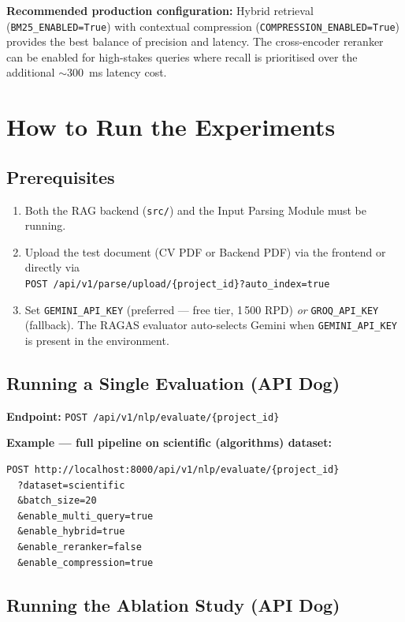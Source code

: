 \documentclass[12pt,a4paper]{article}
\begin{document}
\textbf{Recommended production configuration:} Hybrid retrieval (\texttt{BM25\_ENABLED=True}) with
contextual compression (\texttt{COMPRESSION\_ENABLED=True}) provides the best balance of precision
and latency. The cross-encoder reranker can be enabled for high-stakes queries where recall is
prioritised over the additional $\sim$300~ms latency cost.

\section{How to Run the Experiments}

\subsection{Prerequisites}
\begin{enumerate}
  \item Both the RAG backend (\texttt{src/}) and the Input Parsing Module must be running.
  \item Upload the test document (CV PDF or Backend PDF) via the frontend or directly via\\
    \texttt{POST /api/v1/parse/upload/\{project\_id\}?auto\_index=true}
  \item Set \texttt{GEMINI\_API\_KEY} (preferred — free tier, 1\,500 RPD) \emph{or} \texttt{GROQ\_API\_KEY} (fallback).
    The RAGAS evaluator auto-selects Gemini when \texttt{GEMINI\_API\_KEY} is present in the environment.
\end{enumerate}

\subsection{Running a Single Evaluation (API Dog)}

\textbf{Endpoint:} \texttt{POST /api/v1/nlp/evaluate/\{project\_id\}}

\textbf{Example — full pipeline on scientific (algorithms) dataset:}
\begin{verbatim}
POST http://localhost:8000/api/v1/nlp/evaluate/{project_id}
  ?dataset=scientific
  &batch_size=20
  &enable_multi_query=true
  &enable_hybrid=true
  &enable_reranker=false
  &enable_compression=true
\end{verbatim}

\subsection{Running the Ablation Study (API Dog)}
\end{document}
